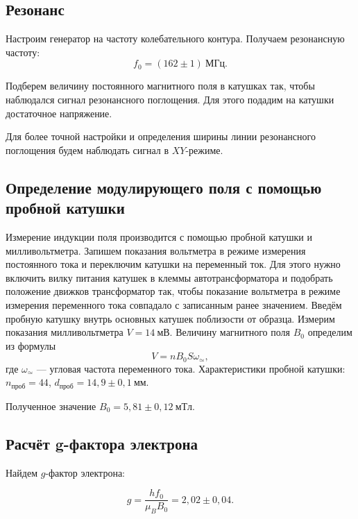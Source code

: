 \documentclass[a4paper, 12pt]{article}
\begin{document}
        \subsection*{Резонанс}
	    
	    
		Настроим генератор на частоту колебательного контура. Получаем резонансную частоту:
		\begin{equation*}
			f_0 = (162 \pm 1) \ \text{МГц}.
		\end{equation*}
	
		Подберем величину постоянного магнитного поля в катушках так, чтобы наблюдался сигнал резонансного поглощения. Для этого подадим на катушки достаточное напряжение.
		
		Для более точной настройки и определения ширины линии резонансного поглощения будем наблюдать сигнал в $XY$-режиме. 
		
		\subsection*{Определение модулирующего поля с помощью пробной катушки}
		
		Измерение индукции поля производится с помощью пробной катушки и милливольтметра. Запишем показания вольтметра в режиме измерения постоянного тока и переключим катушки на переменный ток. Для этого нужно включить вилку питания катушек в клеммы автотрансформатора и подобрать положение движков трансформатор так, чтобы показание вольтметра в режиме измерения переменного тока совпадало с записанным ранее значением. Введём пробную катушку внутрь основных катушек поблизости от образца. Измерим показания милливольтметра $V = 14~мВ$. Величину магнитного поля $B_0$ определим из формулы
$$ V = n B_0 S \omega_{\simeq},$$
где $\omega_{\simeq}$ --- угловая частота переменного тока. Характеристики пробной катушки: $n_{\text{проб}} = 44$, $d_{\text{проб}} = 14,9\pm 0,1~\text{мм}$.
 
Полученное значение $B_0 = 5,81\pm0,12~мТл$.

		\subsection*{Расчёт g-фактора электрона}
		
		Найдем $g$-фактор электрона:
		
		\begin{equation*}
			g = \frac{hf_0}{\mu_BB_0} = 2,02 \pm 0,04.
		\end{equation*}
\end{document}
